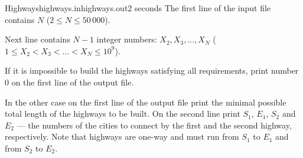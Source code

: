 \begin{problem}{Highways}{highways.in}{highways.out}{2 seconds}
The first line of the input file contains $N$ (${2 \le N \le 50\,000}$). 

Next line contains $N-1$ integer numbers: ${X_2, X_3, \ldots, X_N}$ 
(${1 \le X_2 < X_3 < \ldots < X_N  \le 10^9}$).

\OutputFile

If it is impossible to build the highways satisfying all requirements, print
number $0$ on the first line of the output file. 

In the other case on the first line of the output file print the minimal 
possible total length of the highways to be built. 
On the second line print $S_1$, $E_1$, $S_2$ and $E_2$ --- the numbers of the 
cities to connect by the first and the second highway, respectively. Note 
that highways are one-way and must run from $S_1$ to $E_1$ and from $S_2$ to $E_2$.

\Example

\begin{example}[*]
%
\end{example}

\end{problem}
